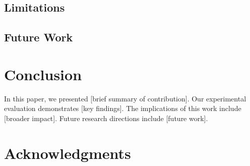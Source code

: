 \documentclass[11pt,a4paper]{article}
\begin{document}

\subsection{Limitations}
\label{subsec:limitations}


\subsection{Future Work}
\label{subsec:future_work}


\section{Conclusion}
\label{sec:conclusion}


In this paper, we presented [brief summary of contribution]. Our experimental evaluation demonstrates [key findings]. The implications of this work include [broader impact]. Future research directions include [future work].

\section*{Acknowledgments}



\end{document}
